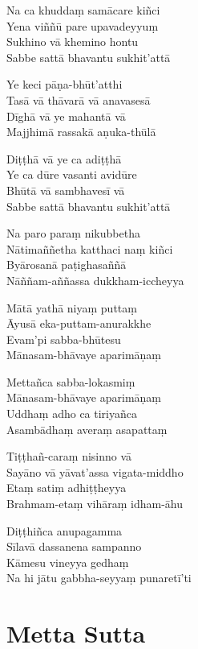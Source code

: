 Na ca khuddaṃ samācare kiñci\\
Yena viññū pare upavadeyyuṃ\\
Sukhino vā khemino hontu\\
Sabbe sattā bhavantu sukhit'attā

Ye keci pāṇa-bhūt'atthi\\
Tasā vā thāvarā vā anavasesā\\
Dīghā vā ye mahantā vā\\
Majjhimā rassakā aṇuka-thūlā

Diṭṭhā vā ye ca adiṭṭhā\\
Ye ca dūre vasanti avidūre\\
Bhūtā vā sambhavesī vā\\
Sabbe sattā bhavantu sukhit'attā

\clearpage

Na paro paraṃ nikubbetha\\
Nātimaññetha katthaci naṃ kiñci\\
Byārosanā paṭighasaññā\\
Nāññam-aññassa dukkham-iccheyya

Mātā yathā niyaṃ puttaṃ\\
Āyusā eka-puttam-anurakkhe\\
Evam'pi sabba-bhūtesu\\
Mānasam-bhāvaye aparimāṇaṃ

Mettañca sabba-lokasmiṃ\\
Mānasam-bhāvaye aparimāṇaṃ\\
Uddhaṃ adho ca tiriyañca\\
Asambādhaṃ averaṃ asapattaṃ

Tiṭṭhañ-caraṃ nisinno vā\\
Sayāno vā yāvat'assa vigata-middho\\
Etaṃ satiṃ adhiṭṭheyya\\
Brahmam-etaṃ vihāraṃ idham-āhu

Diṭṭhiñca anupagamma\\
Sīlavā dassanena sampanno\\
Kāmesu vineyya gedhaṃ\\
Na hi jātu gabbha-seyyaṃ punaretī'ti

\clearpage
\chapter[Metta Sutta]{Metta Sutta}


\begin{leader}
\end{leader}


